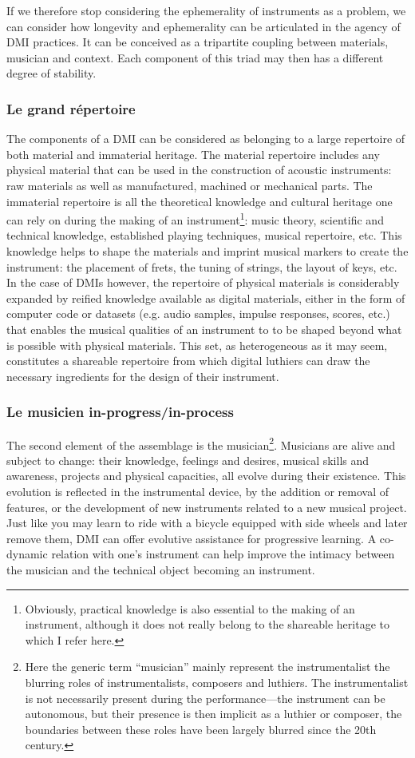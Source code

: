 If we therefore stop considering the ephemerality of instruments as a problem, we can consider how longevity and ephemerality can be articulated in the agency of DMI practices. It can be conceived as a tripartite coupling between materials, musician and context. Each component of this triad may then has a different degree of stability.

\subsubsection{Le grand répertoire}
The components of a DMI can be considered as belonging to a large repertoire of both material and immaterial heritage. The material repertoire includes any physical material that can be used in the construction of acoustic instruments: raw materials as well as manufactured, machined or mechanical parts. 
	The immaterial repertoire is all the theoretical knowledge and cultural heritage one can rely on during the making of an instrument\footnote{Obviously, practical knowledge is also essential to the making of an instrument, although it does not really belong to the shareable heritage to which I refer here.}: music theory, scientific and technical knowledge, established playing techniques, musical repertoire, etc. This knowledge helps to shape the materials and imprint musical markers to create the instrument: the placement of frets, the tuning of strings, the layout of keys, etc.
	In the case of DMIs however, the repertoire of physical materials is considerably expanded by reified knowledge available as digital materials, either in the form of computer code or datasets (e.g. audio samples, impulse responses, scores, etc.) that enables the musical qualities of an instrument to to be shaped beyond what is possible with physical materials.
This set, as heterogeneous as it may seem, constitutes a shareable repertoire from which digital luthiers can draw the necessary ingredients for the design of their instrument.

\subsubsection{Le musicien in-progress/in-process}
The second element of the assemblage is the musician\footnote{Here the generic term “musician” mainly represent the instrumentalist the blurring roles of instrumentalists, composers and luthiers. The instrumentalist is not necessarily present during the performance—the instrument can be autonomous, but their presence is then implicit as a luthier or composer, the boundaries between these roles have been largely blurred since the 20th century.}. Musicians are alive and subject to change: their knowledge, feelings and desires, musical skills and awareness, projects and physical capacities, all evolve during their existence. This evolution is reflected in the instrumental device, by the addition or removal of features, or the development of new instruments related to a new musical project. Just like you may learn to ride with a bicycle equipped with side wheels and later remove them, DMI can offer evolutive assistance for progressive learning. A co-dynamic relation with one's instrument can help improve the intimacy between the musician and the technical object becoming an instrument.

